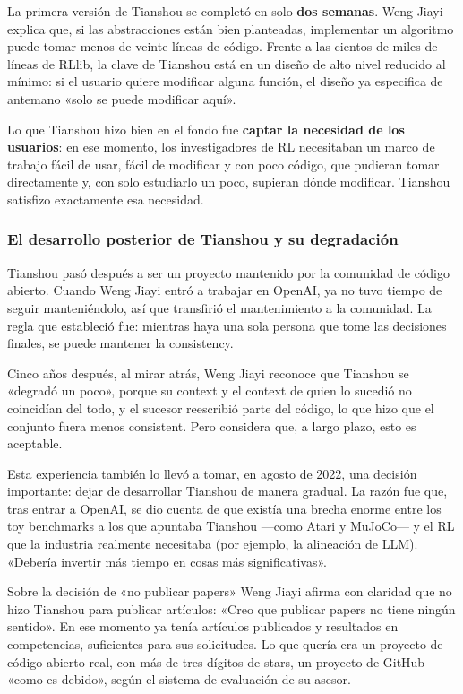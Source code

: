 \documentclass[a4paper]{article}
\begin{document}
La primera versión de Tianshou se completó en solo \textbf{dos semanas}. Weng Jiayi explica que, si las abstracciones están bien planteadas, implementar un algoritmo puede tomar menos de veinte líneas de código. Frente a las cientos de miles de líneas de RLlib, la clave de Tianshou está en un diseño de alto nivel reducido al mínimo: si el usuario quiere modificar alguna función, el diseño ya especifica de antemano «solo se puede modificar aquí».

Lo que Tianshou hizo bien en el fondo fue \textbf{captar la necesidad de los usuarios}: en ese momento, los investigadores de RL necesitaban un marco de trabajo fácil de usar, fácil de modificar y con poco código, que pudieran tomar directamente y, con solo estudiarlo un poco, supieran dónde modificar. Tianshou satisfizo exactamente esa necesidad.

\subsubsection{El desarrollo posterior de Tianshou y su degradación}

Tianshou pasó después a ser un proyecto mantenido por la comunidad de código abierto. Cuando Weng Jiayi entró a trabajar en OpenAI, ya no tuvo tiempo de seguir manteniéndolo, así que transfirió el mantenimiento a la comunidad. La regla que estableció fue: mientras haya una sola persona que tome las decisiones finales, se puede mantener la consistency.

Cinco años después, al mirar atrás, Weng Jiayi reconoce que Tianshou se «degradó un poco», porque su context y el context de quien lo sucedió no coincidían del todo, y el sucesor reescribió parte del código, lo que hizo que el conjunto fuera menos consistent. Pero considera que, a largo plazo, esto es aceptable.

Esta experiencia también lo llevó a tomar, en agosto de 2022, una decisión importante: dejar de desarrollar Tianshou de manera gradual. La razón fue que, tras entrar a OpenAI, se dio cuenta de que existía una brecha enorme entre los toy benchmarks a los que apuntaba Tianshou —como Atari y MuJoCo— y el RL que la industria realmente necesitaba (por ejemplo, la alineación de LLM). «Debería invertir más tiempo en cosas más significativas».

\begin{warningbox}{Sobre la decisión de «no publicar papers»}
Weng Jiayi afirma con claridad que no hizo Tianshou para publicar artículos: «Creo que publicar papers no tiene ningún sentido». En ese momento ya tenía artículos publicados y resultados en competencias, suficientes para sus solicitudes. Lo que quería era un proyecto de código abierto real, con más de tres dígitos de stars, un proyecto de GitHub «como es debido», según el sistema de evaluación de su asesor.
\end{warningbox}
\end{document}
